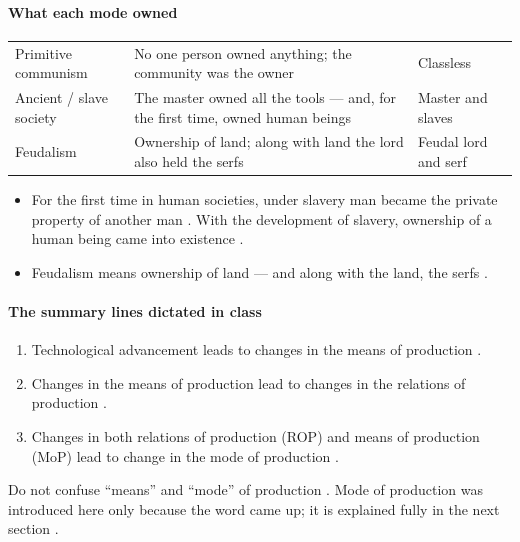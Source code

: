 \paragraph{What each mode owned}
\begin{table}[h!]
\centering
\begin{tabularx}{\textwidth}{lYY}
\toprule
{}
 &  &  \\
\midrule
Primitive communism & No one person owned anything; the community was the owner & Classless \\
Ancient / slave society & The master owned all the tools --- and, for the first time, owned human beings & Master and slaves \\
Feudalism & Ownership of land; along with land the lord also held the serfs & Feudal lord and serf \\
\bottomrule
\end{tabularx}
\end{table}

\begin{CriticalPoint}
\begin{itemize}
    \item For the first time in human societies, under slavery man became the private property of another man . With the development of slavery, ownership of a human being came into existence .
    \item Feudalism means ownership of land --- and along with the land, the serfs .
\end{itemize}
\end{CriticalPoint}

\paragraph{The summary lines dictated in class}
\begin{enumerate}
    \item Technological advancement leads to changes in the means of production .
    \item Changes in the means of production lead to changes in the relations of production .
    \item Changes in both relations of production (ROP) and means of production (MoP) lead to change in the mode of production .
\end{enumerate}
Do not confuse ``means'' and ``mode'' of production . Mode of production was introduced here only because the word came up; it is explained fully in the next section .

